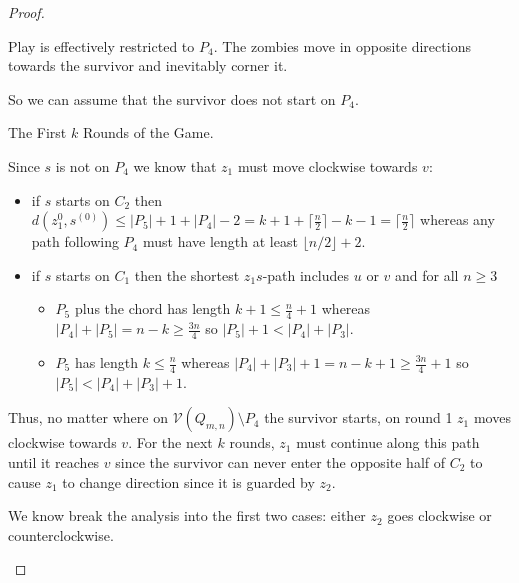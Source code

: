 \documentclass[letterpaper, 10pt]{article}
\newcommand{\V}{\mathcal{V}}
\begin{document}
\begin{proof}
\begin{proofpart}
Play is effectively restricted to $P_4$. The zombies
move in opposite directions towards the survivor and inevitably corner it.

So we can assume that the survivor does not start on $P_4$.

\end{proofpart}

\begin{proofpart} The First $k$ Rounds of the Game.

Since $s$ is not on $P_4$ we know that $z_1$ must move clockwise towards $v$:
\begin{itemize}
\item if $s$ starts on $C_2$ then
$d(z_1^{0}, s^{(0)}) \leq |P_5| + 1 + |P_4| - 2
= k + 1 + \lceil\frac{n}{2} \rceil -k - 1
= \lceil \frac{n}{2} \rceil$
whereas any path following $P_4$ must have length at least $\lfloor n/2 \rfloor +2$.
\item if $s$ starts on $C_1$ then the shortest $z_1s$-path includes $u$ or $v$ and for all $n \geq3$
\begin{itemize}
  \item $P_5$ plus the chord has length $k+1 \leq \frac{n}{4} + 1$
  whereas $|P_4| + |P_5| = n -k \geq \frac{3n}{4}$ so $|P_5| +1 < |P_4|+|P_3|$.
  \item $P_5$ has length $k \leq \frac{n}{4}$ whereas
  $|P_4| + |P_3| + 1 = n - k + 1 \geq \frac{3n}{4} +1$ so $|P_5| < |P_4| + |P_3| + 1$.
\end{itemize}
\end{itemize}
Thus, no matter where on $\V(Q_{m,n}) \setminus {P_4}$ the survivor starts, on round 1 $z_1$ moves
clockwise towards $v$. For the next $k$ rounds, $z_1$ must continue along this path
until it reaches $v$ since the survivor can never enter the opposite half of $C_2$ to
cause $z_1$ to change direction since it is guarded by $z_2$.

We know break the analysis into the first two cases: either $z_2$ goes clockwise or counterclockwise.

\end{proofpart}

\end{proof}
\end{document}
